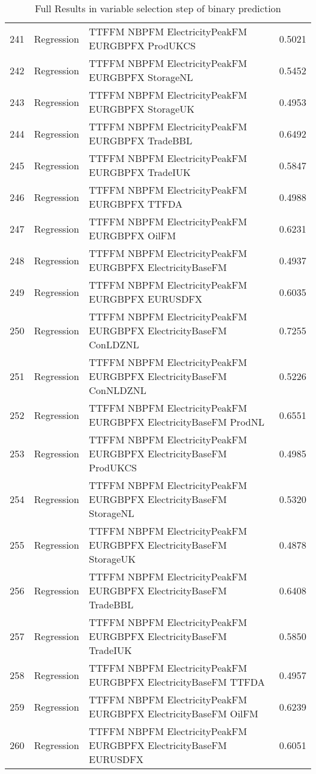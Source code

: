 \begin{table}[ht]
\begin{tabular}{rllr}
  241 & Regression & TTFFM NBPFM ElectricityPeakFM EURGBPFX ProdUKCS & 0.5021 \\ 
  242 & Regression & TTFFM NBPFM ElectricityPeakFM EURGBPFX StorageNL & 0.5452 \\ 
  243 & Regression & TTFFM NBPFM ElectricityPeakFM EURGBPFX StorageUK & 0.4953 \\ 
  244 & Regression & TTFFM NBPFM ElectricityPeakFM EURGBPFX TradeBBL & 0.6492 \\ 
  245 & Regression & TTFFM NBPFM ElectricityPeakFM EURGBPFX TradeIUK & 0.5847 \\ 
  246 & Regression & TTFFM NBPFM ElectricityPeakFM EURGBPFX TTFDA & 0.4988 \\ 
  247 & Regression & TTFFM NBPFM ElectricityPeakFM EURGBPFX OilFM & 0.6231 \\ 
  248 & Regression & TTFFM NBPFM ElectricityPeakFM EURGBPFX ElectricityBaseFM & 0.4937 \\ 
  249 & Regression & TTFFM NBPFM ElectricityPeakFM EURGBPFX EURUSDFX & 0.6035 \\ 
  250 & Regression & TTFFM NBPFM ElectricityPeakFM EURGBPFX ElectricityBaseFM ConLDZNL & 0.7255 \\ 
  251 & Regression & TTFFM NBPFM ElectricityPeakFM EURGBPFX ElectricityBaseFM ConNLDZNL & 0.5226 \\ 
  252 & Regression & TTFFM NBPFM ElectricityPeakFM EURGBPFX ElectricityBaseFM ProdNL & 0.6551 \\ 
  253 & Regression & TTFFM NBPFM ElectricityPeakFM EURGBPFX ElectricityBaseFM ProdUKCS & 0.4985 \\ 
  254 & Regression & TTFFM NBPFM ElectricityPeakFM EURGBPFX ElectricityBaseFM StorageNL & 0.5320 \\ 
  255 & Regression & TTFFM NBPFM ElectricityPeakFM EURGBPFX ElectricityBaseFM StorageUK & 0.4878 \\ 
  256 & Regression & TTFFM NBPFM ElectricityPeakFM EURGBPFX ElectricityBaseFM TradeBBL & 0.6408 \\ 
  257 & Regression & TTFFM NBPFM ElectricityPeakFM EURGBPFX ElectricityBaseFM TradeIUK & 0.5850 \\ 
  258 & Regression & TTFFM NBPFM ElectricityPeakFM EURGBPFX ElectricityBaseFM TTFDA & 0.4957 \\ 
  259 & Regression & TTFFM NBPFM ElectricityPeakFM EURGBPFX ElectricityBaseFM OilFM & 0.6239 \\ 
  260 & Regression & TTFFM NBPFM ElectricityPeakFM EURGBPFX ElectricityBaseFM EURUSDFX & 0.6051 \\ 
   \hline
\end{tabular}
\caption{Full Results in variable selection step of binary prediction} 
\label{tab:binary.var.selection.full}
\end{table}
